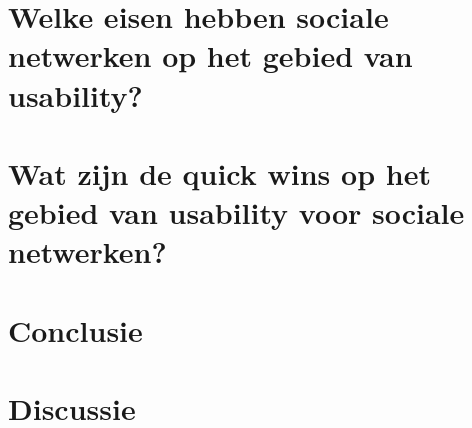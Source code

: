 \documentclass[a4paper, 10pt, pdftex]{article}
\begin{document}
  \newpage
  \section{Welke eisen hebben sociale netwerken op het gebied van usability?}

  \newpage
  \section{Wat zijn de quick wins op het gebied van usability voor sociale netwerken?}

  \newpage
  \section{Conclusie}

  \newpage
  \section{Discussie}

  
  
\end{document}
